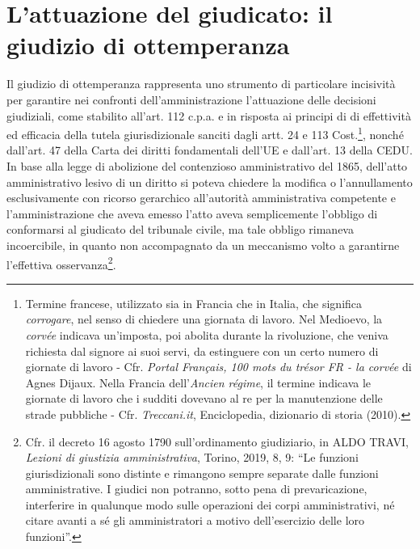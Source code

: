 \documentclass[12pt,it,a4paper,]{report}
\begin{document}
\hypertarget{lattuazione-del-giudicato-il-giudizio-di-ottemperanza}{%
\section{L'attuazione del giudicato: il giudizio di
ottemperanza}\label{lattuazione-del-giudicato-il-giudizio-di-ottemperanza}}

Il giudizio di ottemperanza rappresenta uno strumento di particolare
incisività per garantire nei confronti dell'amministrazione l'attuazione
delle decisioni giudiziali, come stabilito all'art. 112 c.p.a. e in
risposta ai principi di di effettività ed efficacia della tutela
giurisdizionale sanciti dagli artt. 24 e 113 Cost.\footnote{Termine
  francese, utilizzato sia in Francia che in Italia, che significa
  \emph{corrogare}, nel senso di chiedere una giornata di lavoro. Nel
  Medioevo, la \emph{corvée} indicava un'imposta, poi abolita durante la
  rivoluzione, che veniva richiesta dal signore ai suoi servi, da
  estinguere con un certo numero di giornate di lavoro - Cfr.
  \emph{Portal Français, 100 mots du trésor FR - la corvée} di Agnes
  Dijaux. Nella Francia dell'\emph{Ancien régime}, il termine indicava
  le giornate di lavoro che i sudditi dovevano al re per la manutenzione
  delle strade pubbliche - Cfr. \emph{Treccani.it}, Enciclopedia,
  dizionario di storia (2010).}, nonché dall'art. 47 della Carta dei
diritti fondamentali dell'UE e dall'art. 13 della CEDU. In base alla
legge di abolizione del contenzioso amministrativo del 1865, dell'atto
amministrativo lesivo di un diritto si poteva chiedere la modifica o
l'annullamento esclusivamente con ricorso gerarchico all'autorità
amministrativa competente e l'amministrazione che aveva emesso l'atto
aveva semplicemente l'obbligo di conformarsi al giudicato del tribunale
civile, ma tale obbligo rimaneva incoercibile, in quanto non
accompagnato da un meccanismo volto a garantirne l'effettiva
osservanza\footnote{Cfr. il decreto 16 agosto 1790 sull'ordinamento
  giudiziario, in ALDO TRAVI, \emph{Lezioni di giustizia
  amministrativa}, Torino, 2019, 8, 9: ``Le funzioni giurisdizionali
  sono distinte e rimangono sempre separate dalle funzioni
  amministrative. I giudici non potranno, sotto pena di prevaricazione,
  interferire in qualunque modo sulle operazioni dei corpi
  amministrativi, né citare avanti a sé gli amministratori a motivo
  dell'esercizio delle loro funzioni''.}.
\end{document}
